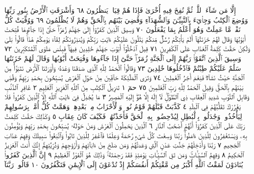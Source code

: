 إِلَّا مَن شَآءَ ٱللَّهُۖ ثُمَّ نُفِخَ فِيهِ أُخْرَىٰ فَإِذَا هُمْ قِيَامࣱ يَنظُرُونَ ٦٨
وَأَشْرَقَتِ ٱلْأَرْضُ بِنُورِ رَبِّهَا وَوُضِعَ ٱلْكِتَٰبُ وَجِا۟يٓءَ
بِٱلنَّبِيِّـۧنَ وَٱلشُّهَدَآءِ وَقُضِيَ بَيْنَهُم بِٱلْحَقِّ وَهُمْ لَا يُظْلَمُونَ ٦٩
وَوُفِّيَتْ كُلُّ نَفْسࣲ مَّا عَمِلَتْ وَهُوَ أَعْلَمُ بِمَا يَفْعَلُونَ ٧٠
وَسِيقَ ٱلَّذِينَ كَفَرُوٓا۟ إِلَىٰ جَهَنَّمَ زُمَرًاۖ حَتَّىٰٓ إِذَا جَآءُوهَا
فُتِحَتْ أَبْوَٰبُهَا وَقَالَ لَهُمْ خَزَنَتُهَآ أَلَمْ يَأْتِكُمْ رُسُلࣱ مِّنكُمْ
يَتْلُونَ عَلَيْكُمْ ءَايَٰتِ رَبِّكُمْ وَيُنذِرُونَكُمْ لِقَآءَ يَوْمِكُمْ
هَٰذَاۚ قَالُوا۟ بَلَىٰ وَلَٰكِنْ حَقَّتْ كَلِمَةُ ٱلْعَذَابِ عَلَى ٱلْكَٰفِرِينَ ٧١
قِيلَ ٱدْخُلُوٓا۟ أَبْوَٰبَ جَهَنَّمَ خَٰلِدِينَ فِيهَاۖ فَبِئْسَ مَثْوَى
ٱلْمُتَكَبِّرِينَ ٧٢ وَسِيقَ ٱلَّذِينَ ٱتَّقَوْا۟ رَبَّهُمْ إِلَى ٱلْجَنَّةِ
زُمَرًاۖ حَتَّىٰٓ إِذَا جَآءُوهَا وَفُتِحَتْ أَبْوَٰبُهَا وَقَالَ لَهُمْ خَزَنَتُهَا
سَلَٰمٌ عَلَيْكُمْ طِبْتُمْ فَٱدْخُلُوهَا خَٰلِدِينَ ٧٣ وَقَالُوا۟
ٱلْحَمْدُ لِلَّهِ ٱلَّذِي صَدَقَنَا وَعْدَهُۥ وَأَوْرَثَنَا ٱلْأَرْضَ
نَتَبَوَّأُ مِنَ ٱلْجَنَّةِ حَيْثُ نَشَآءُۖ فَنِعْمَ أَجْرُ ٱلْعَٰمِلِينَ ٧٤
وَتَرَى ٱلْمَلَٰٓئِكَةَ حَآفِّينَ مِنْ حَوْلِ ٱلْعَرْشِ يُسَبِّحُونَ بِحَمْدِ
رَبِّهِمْۚ وَقُضِيَ بَيْنَهُم بِٱلْحَقِّۚ وَقِيلَ ٱلْحَمْدُ لِلَّهِ رَبِّ ٱلْعَٰلَمِينَ ٧٥
حمٓ ١ تَنزِيلُ ٱلْكِتَٰبِ مِنَ ٱللَّهِ ٱلْعَزِيزِ ٱلْعَلِيمِ ٢ غَافِرِ ٱلذَّنۢبِ
وَقَابِلِ ٱلتَّوْبِ شَدِيدِ ٱلْعِقَابِ ذِي ٱلطَّوْلِۖ لَآ إِلَٰهَ إِلَّا هُوَۖ إِلَيْهِ
ٱلْمَصِيرُ ٣ مَا يُجَٰدِلُ فِيٓ ءَايَٰتِ ٱللَّهِ إِلَّا ٱلَّذِينَ كَفَرُوا۟ فَلَا يَغْرُرْكَ
تَقَلُّبُهُمْ فِي ٱلْبِلَٰدِ ٤ كَذَّبَتْ قَبْلَهُمْ قَوْمُ نُوحࣲ وَٱلْأَحْزَابُ
مِنۢ بَعْدِهِمْۖ وَهَمَّتْ كُلُّ أُمَّةِۭ بِرَسُولِهِمْ لِيَأْخُذُوهُۖ
وَجَٰدَلُوا۟ بِٱلْبَٰطِلِ لِيُدْحِضُوا۟ بِهِ ٱلْحَقَّ فَأَخَذْتُهُمْۖ فَكَيْفَ
كَانَ عِقَابِ ٥ وَكَذَٰلِكَ حَقَّتْ كَلِمَتُ رَبِّكَ عَلَى ٱلَّذِينَ
كَفَرُوٓا۟ أَنَّهُمْ أَصْحَٰبُ ٱلنَّارِ ٦ ٱلَّذِينَ يَحْمِلُونَ ٱلْعَرْشَ
وَمَنْ حَوْلَهُۥ يُسَبِّحُونَ بِحَمْدِ رَبِّهِمْ وَيُؤْمِنُونَ بِهِۦ وَيَسْتَغْفِرُونَ
لِلَّذِينَ ءَامَنُوا۟ۖ رَبَّنَا وَسِعْتَ كُلَّ شَيْءࣲ رَّحْمَةࣰ وَعِلْمࣰا فَٱغْفِرْ
لِلَّذِينَ تَابُوا۟ وَٱتَّبَعُوا۟ سَبِيلَكَ وَقِهِمْ عَذَابَ ٱلْجَحِيمِ ٧
رَبَّنَا وَأَدْخِلْهُمْ جَنَّٰتِ عَدْنٍ ٱلَّتِي وَعَدتَّهُمْ وَمَن صَلَحَ
مِنْ ءَابَآئِهِمْ وَأَزْوَٰجِهِمْ وَذُرِّيَّٰتِهِمْۚ إِنَّكَ أَنتَ ٱلْعَزِيزُ
ٱلْحَكِيمُ ٨ وَقِهِمُ ٱلسَّيِّـَٔاتِۚ وَمَن تَقِ ٱلسَّيِّـَٔاتِ
يَوْمَئِذࣲ فَقَدْ رَحِمْتَهُۥۚ وَذَٰلِكَ هُوَ ٱلْفَوْزُ ٱلْعَظِيمُ ٩ إِنَّ
ٱلَّذِينَ كَفَرُوا۟ يُنَادَوْنَ لَمَقْتُ ٱللَّهِ أَكْبَرُ مِن مَّقْتِكُمْ
أَنفُسَكُمْ إِذْ تُدْعَوْنَ إِلَى ٱلْإِيمَٰنِ فَتَكْفُرُونَ ١٠ قَالُوا۟ رَبَّنَآ
